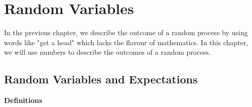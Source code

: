\documentclass[a4paper, 12pt,twoside]{book}
\begin{document}
\pagestyle{fancy}
\fancyhf{}
\renewcommand{\chaptermark}[1]{ \markboth{#1}{} }
\fancyhead[CE,CO]{\leftmark}
\fancyfoot[LE,RO]{\thepage}

\chapter{Random Variables}
In the previous chapter, we describe the outcome of a random process by using words like "get a head" which lacks the flavour of mathematics. In this chapter, we will use numbers to describe the outcomes of a random process.
\newpage
\section{\large{Random Variables and Expectations}}
\vspace{0.3cm}

\textbf{Definitions}
\end{document}
